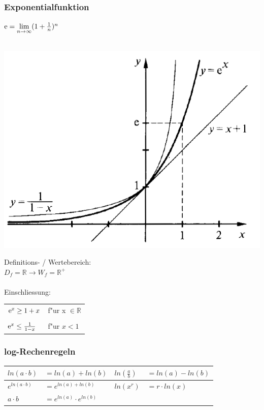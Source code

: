 		\subsubsection{Exponentialfunktion}
			$\mathrm{e} = \lim\limits_{n \to \infty} (1+\frac{1}{n})^n $ \\
				\\
			\begin{minipage}{.45\linewidth}
				\includegraphics[width=0.95\linewidth]{Bilder/exp-funktion}
			\end{minipage}
			\hfill
			\begin{minipage}{.5\linewidth}
				Definitions- / Wertebereich: \\
				$D_f = \mathbb{R} \rightarrow W_f = \mathbb{R^+}$ \\
				\\
				Einschliessung: \\
					\begin{tabular}{ll}
					$\mathrm{e}^x \geq 1 + x$ & f"ur x $\in \mathbb{R}$ \\
					\\
					$\mathrm{e}^x \leq \frac{1}{1-x}$ & f"ur $x < 1$  \\
					\end{tabular}
			\end{minipage}

		\subsubsection{log-Rechenregeln}
			\begin{tabular}{|ll|ll|}
				\hline
				$ln(a \cdot b)$ & $= ln(a) + ln(b)$         & $ln(\frac{a}{b})$ & $= ln(a) - ln(b)$ \\
				\hline
				$e^{ln(a \cdot b)}$ & $= e^{ln(a) + ln(b)}$ & $ln(x^r)$         & $= r \cdot ln(x)$ \\
				\hline
				$a \cdot b$ & $= e^{ln(a)} \cdot e^{ln(b)}$ &                   &                   \\
				\hline
			\end{tabular}

